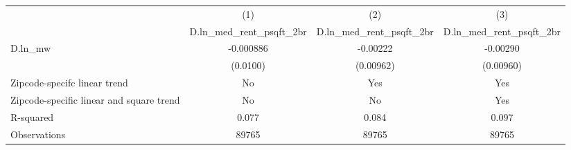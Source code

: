 {
\def\sym#1{\ifmmode^{#1}\else\(^{#1}\)\fi}
\begin{tabular}{l*{3}{c}}
\hline\hline
          &\multicolumn{1}{c}{(1)}&\multicolumn{1}{c}{(2)}&\multicolumn{1}{c}{(3)}\\
          &\multicolumn{1}{c}{D.ln\_med\_rent\_psqft\_2br}&\multicolumn{1}{c}{D.ln\_med\_rent\_psqft\_2br}&\multicolumn{1}{c}{D.ln\_med\_rent\_psqft\_2br}\\
\hline
D.ln\_mw   &-0.000886         & -0.00222         & -0.00290         \\
          & (0.0100)         &(0.00962)         &(0.00960)         \\
\hline
Zipcode-specifc linear trend&       No         &      Yes         &      Yes         \\
Zipcode-specific linear and square trend&       No         &       No         &      Yes         \\
R-squared &    0.077         &    0.084         &    0.097         \\
Observations&    89765         &    89765         &    89765         \\
\hline\hline
\end{tabular}
}
